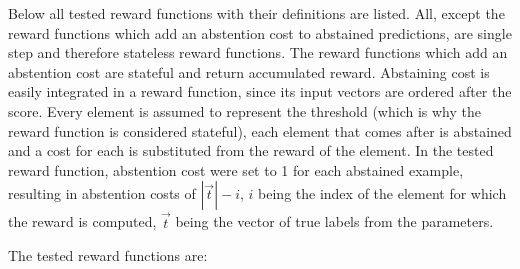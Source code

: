 \documentclass[twoside,11pt]{article}
\begin{document}
Below all tested reward functions with their definitions
are listed.
All, except the reward functions
which add an abstention cost to abstained predictions,
are single step and therefore stateless reward functions.
The reward functions which add an abstention cost are
stateful and return accumulated reward.
Abstaining cost is easily integrated in a reward function,
since its input vectors are ordered after the score.
Every element is assumed to represent the threshold (which
is why the reward function is considered stateful), each
element that comes after is abstained and a cost for each
is substituted from the reward of the element.
In the tested reward function, abstention cost were set to
1 for each abstained example, resulting in abstention costs
of $|\vec{t}| - i$, $i$ being the index of the element
for which the reward is computed, $\vec{t}$ being the
vector of true labels from the parameters.

The tested reward functions are:
\end{document}
